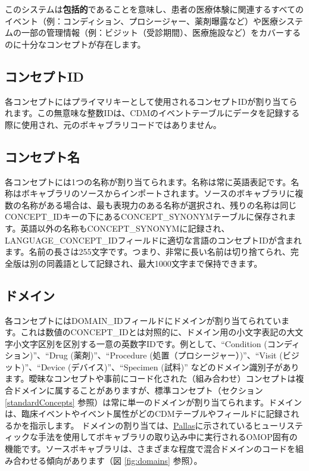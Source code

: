 \documentclass[
  11pt]{book}
\theoremstyle{definition}
\theoremstyle{definition}
\theoremstyle{definition}
\theoremstyle{definition}
\theoremstyle{remark}
\begin{document}
このシステムは\textbf{包括的}であることを意味し、患者の医療体験に関連するすべてのイベント（例：コンディション、プロシージャー、薬剤曝露など）や医療システムの一部の管理情報（例：ビジット（受診期間）、医療施設など）をカバーするのに十分なコンセプトが存在します。

\subsection{コンセプトID}\label{ux30b3ux30f3ux30bbux30d7ux30c8id}

各コンセプトにはプライマリキーとして使用されるコンセプトIDが割り当てられます。この無意味な整数IDは、CDMのイベントテーブルにデータを記録する際に使用され、元のボキャブラリコードではありません。 

\subsection{コンセプト名}\label{ux30b3ux30f3ux30bbux30d7ux30c8ux540d}

各コンセプトには1つの名称が割り当てられます。名称は常に英語表記です。名称はボキャブラリのソースからインポートされます。ソースのボキャブラリに複数の名称がある場合は、最も表現力のある名称が選択され、残りの名称は同じCONCEPT\_IDキーの下にあるCONCEPT\_SYNONYMテーブルに保存されます。英語以外の名称もCONCEPT\_SYNONYMに記録され、LANGUAGE\_CONCEPT\_IDフィールドに適切な言語のコンセプトIDが含まれます。名前の長さは255文字です。つまり、非常に長い名前は切り捨てられ、完全版は別の同義語として記録され、最大1000文字まで保持できます。

\subsection{ドメイン}\label{conceptDomains}

各コンセプトにはDOMAIN\_IDフィールドにドメインが割り当てられています。これは数値のCONCEPT\_IDとは対照的に、ドメイン用の小文字表記の大文字小文字区別を区別する一意の英数字IDです。例として、``Condition (コンディション)''、``Drug (薬剤)''、``Procedure (処置（プロシージャー）)''、``Visit (ビジット)''、``Device (デバイス)''、``Specimen (試料)'' などのドメイン識別子があります。曖昧なコンセプトや事前にコード化された（組み合わせ）コンセプトは複合ドメインに属することがありますが、標準コンセプト（セクション \ref{standardConcepts} 参照）は常に単一のドメインが割り当てられます。ドメインは、臨床イベントやイベント属性がどのCDMテーブルやフィールドに記録されるかを指示します。 ドメインの割り当ては、\href{https://github.com/ohDSI/vocabulary-v5.0}{Pallas}に示されているヒューリスティックな手法を使用してボキャブラリの取り込み中に実行されるOMOP固有の機能です。ソースボキャブラリは、さまざまな程度で混合ドメインのコードを組み合わせる傾向があります（図 \ref{fig:domains} 参照）。
\end{document}
